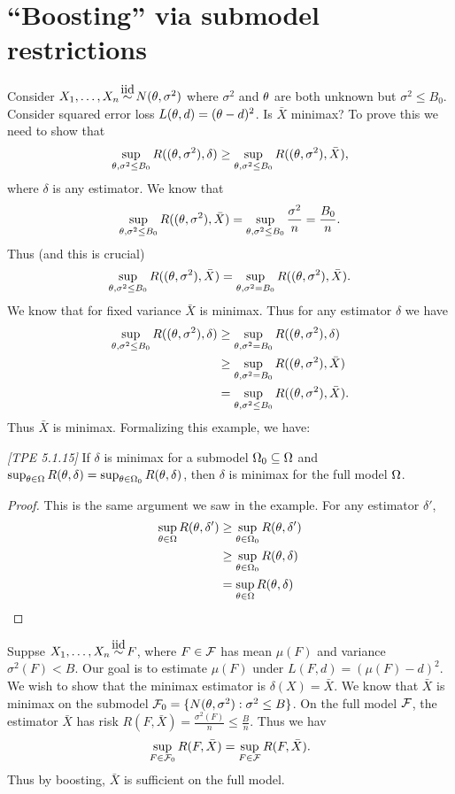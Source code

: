 \section{``Boosting'' via submodel restrictions}
Consider $X_1,\ldots, X_n \iid N(\ta,\sigma^2)$ where $\sigma^2$ and ${\theta}$ are both unknown but $\sigma^2 \le B_0$. Consider squared error loss $L({\theta},d)= ({\theta}-d)^2$. Is $\bar{X}$ minimax? To prove this we need to show that
\[\sup_{{\theta},\sigma^2 \le B_0} R(({\theta},\sigma^2), \delta) \ge \sup_{{\theta},\sigma^2\le B_0}R(({\theta},\sigma^2),\bar{X}), \]
where $\delta$ is any estimator. We know that 
\[\sup_{{\theta},\sigma^2\le B_0}R(({\theta},\sigma^2),\bar{X}) = \sup_{{\theta},\sigma^2\le B_0} \frac{\sigma^2}{n} = \frac{B_0}{n}. \]
Thus (and this is crucial)
\[\sup_{{\theta},\sigma^2\le B_0}R(({\theta},\sigma^2),\bar{X}) =\sup_{{\theta},\sigma^2= B_0}R(({\theta},\sigma^2),\bar{X}).  \]
We know that for fixed variance $\bar{X}$ is minimax. Thus for any estimator $\delta$ we have
\begin{align*}
    \sup_{{\theta},\sigma^2 \le B_0} R(({\theta},\sigma^2), \delta)&\ge \sup_{{\theta},\sigma^2 = B_0} R(({\theta},\sigma^2), \delta)\\
    &\ge \sup_{{\theta},\sigma^2 = B_0} R(({\theta},\sigma^2), \bar{X})\\
    &=\sup_{{\theta},\sigma^2 \le B_0} R(({\theta},\sigma^2), \bar{X}).
\end{align*}
Thus $\bar{X}$ is minimax. Formalizing this example, we have:
\begin{lemma}
    \emph{[TPE 5.1.15]} If $\delta$ is minimax for a submodel ${{\Omega}}_0 \subseteq {{\Omega}}$ and $\sup_{{\theta} \in {{\Omega}}}R({\theta},\delta)= \sup_{{\theta} \in {{\Omega}}_0}R({\theta},\delta)$, then $\delta$ is minimax for the full model ${{\Omega}}$.
\end{lemma}
\begin{proof}
    This is the same argument we saw in the example. For any estimator $\delta'$,
    \begin{align*}
        \sup_{{\theta} \in {{\Omega}}} R({\theta},\delta')&\ge \sup_{{\theta} \in {{\Omega}}_0} R({\theta},\delta')\\
        &\ge \sup_{{\theta} \in {{\Omega}}_0}R({\theta},\delta)\\
        &=\sup_{{\theta} \in {{\Omega}}} R({\theta},\delta) \qedhere
    \end{align*}
\end{proof}
\begin{ex}
     Suppse $X_1,\ldots, X_n \iid F$, where $F \in {\mathcal{F}}$ has mean $\mu(F)$ and variance $\sigma^2(F) < B$. Our goal is to estimate $\mu(F)$ under $L(F,d) = (\mu(F)-d)^2$. We wish to show that the minimax estimator is $\delta(X)=\bar{X}$.  We know that $\bar{X}$ is minimax on the submodel ${\mathcal{F}}_0 = \{N({\theta},\sigma^2):\sigma^2 \le B\}$. On the full model ${\mathcal{F}}$, the estimator $\bar{X}$ has risk $R(F,\bar{X}) = \frac{\sigma^2(F)}{n} \le \frac{B}{n}$. Thus we hav 
    \[\sup_{F\in {\mathcal{F}}_0}R(F,\bar{X}) = \sup_{F \in {\mathcal{F}}} R(F,\bar{X}). \]
    Thus by boosting, $\bar{X}$ is sufficient on the full model.
\end{ex}
